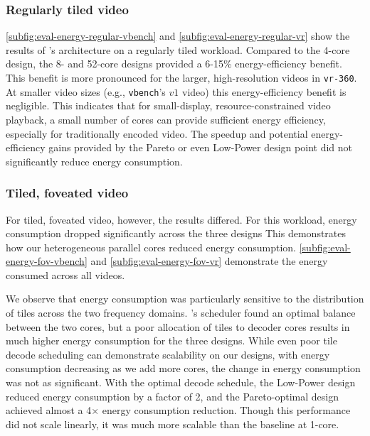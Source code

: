 \subsubsection{Regularly tiled video}

\ref{subfig:eval-energy-regular-vbench} and \ref{subfig:eval-energy-regular-vr} show the results of \nameArch's architecture on a regularly tiled workload.
Compared to the 4-core design, the 8- and 52-core designs provided a 6-15\% energy-efficiency benefit.
This benefit is more pronounced for the larger, high-resolution videos in \texttt{vr-360}.
At smaller video sizes (e.g., \texttt{vbench}'s $v1$ video) this energy-efficiency benefit is negligible.
This indicates that for small-display, resource-constrained video playback, a small number of cores can provide sufficient energy efficiency, especially for traditionally encoded video.
The speedup and potential energy-efficiency gains provided by the Pareto or even Low-Power design point did not significantly reduce energy consumption.

\subsubsection{Tiled, foveated video}
For tiled, foveated video, however, the results differed.
For this workload, energy consumption dropped significantly across the three designs
This demonstrates how our heterogeneous parallel cores reduced energy consumption.
\ref{subfig:eval-energy-fov-vbench} and \ref{subfig:eval-energy-fov-vr} demonstrate the energy consumed across all videos.

We observe that energy consumption was particularly sensitive to the distribution of tiles across the two frequency domains.
\nameArch's scheduler found an optimal balance between the two cores, but a poor allocation of tiles to decoder cores results in much higher energy consumption for the three \nameArch designs.
While even poor tile decode scheduling can demonstrate scalability on our designs, with energy consumption decreasing as we add more cores, the change in energy consumption was not as significant.
With the optimal decode schedule, the Low-Power design reduced energy consumption by a factor of 2, and the Pareto-optimal design achieved almost a 4$\times$ energy consumption reduction.
Though this performance did not scale linearly, it was much more scalable than the baseline at 1-core.

